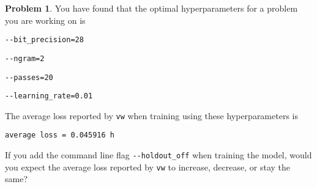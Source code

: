 \documentclass[10pt]{exam}
\theoremstyle{definition}
\newtheorem{problem}{Problem}
\begin{document}
\vspace{3in}
\begin{problem}
    You have found that the optimal hyperparameters for a problem you are working on is
        
        \vspace{0.1in}
        \lstinline{--bit_precision=28}

        \lstinline{--ngram=2}

        \lstinline{--passes=20}

        \lstinline{--learning_rate=0.01}
        \vspace{0.1in}

    \noindent
    The average loss reported by \lstinline{vw} when training using these hyperparameters is

    \vspace{0.1in}
    \lstinline{average loss = 0.045916 h}

    \vspace{0.1in}
    \noindent
    If you add the command line flag \lstinline{--holdout_off} when training the model, would you expect the average loss reported by \lstinline{vw} to increase, decrease, or stay the same?  
\end{problem}
\end{document}
